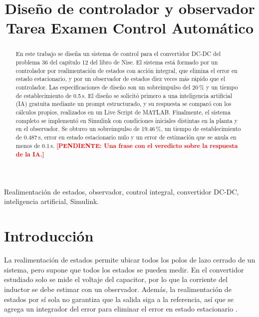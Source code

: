 \documentclass[conference]{IEEEtran}
\newcommand{\pendiente}[1]{\textcolor{red}{\textbf{[PENDIENTE: #1]}}}
\begin{document}
\title{Diseño de controlador y observador\\ Tarea Examen Control Automático}

\author{
}

\maketitle

\begin{abstract}
En este trabajo se diseña un sistema de control para el convertidor DC-DC del problema 36 del capítulo 12 del libro de Nise. El sistema está formado por un controlador por realimentación de estados con acción integral, que elimina el error en estado estacionario, y por un observador de estados diez veces más rápido que el controlador. Las especificaciones de diseño son un sobreimpulso del 20\,\% y un tiempo de establecimiento de 0.5\,s. El diseño se solicitó primero a una inteligencia artificial (IA) gratuita mediante un prompt estructurado, y su respuesta se comparó con los cálculos propios, realizados en un Live Script de MATLAB. Finalmente, el sistema completo se implementó en Simulink con condiciones iniciales distintas en la planta y en el observador. Se obtuvo un sobreimpulso de 19.46\,\%, un tiempo de establecimiento de 0.487\,s, error en estado estacionario nulo y un error de estimación que se anula en menos de 0.1\,s. \pendiente{Una frase con el veredicto sobre la respuesta de la IA.}
\end{abstract}

\begin{IEEEkeywords}
Realimentación de estados, observador, control integral, convertidor DC-DC, inteligencia artificial, Simulink.
\end{IEEEkeywords}

\section{Introducción}

La realimentación de estados permite ubicar todos los polos de lazo cerrado de un sistema, pero supone que todos los estados se pueden medir. En el convertidor estudiado solo se mide el voltaje del capacitor, por lo que la corriente del inductor se debe estimar con un observador. Además, la realimentación de estados por sí sola no garantiza que la salida siga a la referencia, así que se agrega un integrador del error para eliminar el error en estado estacionario \cite{nise}.
\end{document}
